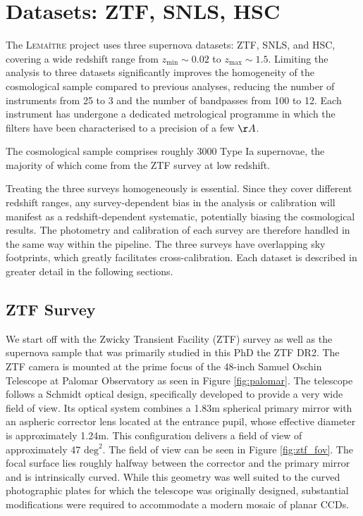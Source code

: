 \section{Datasets: ZTF, SNLS, HSC}

The \textsc{Lema\^{i}tre} project uses three supernova datasets: ZTF, 
SNLS, and HSC, covering a wide redshift range from $z_{\text{min}} \sim 0.02$ 
to $z_{\text{max}} \sim 1.5$. Limiting the analysis to three datasets 
significantly improves the homogeneity of the cosmological sample compared 
to previous analyses, reducing the number of instruments from 25 to 3 and 
the number of bandpasses from 100 to 12. Each instrument has undergone a 
dedicated metrological programme in which the filters have been characterised 
to a precision of a few $\AA$.

The cosmological sample comprises roughly 3000 Type Ia supernovae, the 
majority of which come from the ZTF survey at low redshift.

Treating the three surveys homogeneously is essential. Since they cover 
different redshift ranges, any survey-dependent bias in the analysis or 
calibration will manifest as a redshift-dependent systematic, potentially 
biasing the cosmological results. The photometry and calibration of each 
survey are therefore handled in the same way within the pipeline. The three 
surveys have overlapping sky footprints, which greatly facilitates 
cross-calibration. Each dataset is described in greater detail in the 
following sections.

\subsection{ZTF Survey} \label{sec:ztf}
We start off with the Zwicky Transient Facility (ZTF) survey as well as the supernova sample that was primarily studied in this PhD the ZTF DR2. 
The ZTF camera is mounted at the prime focus of the 48-inch Samuel 
Oschin Telescope at Palomar Observatory as seen in Figure \ref{fig:palomar}. The telescope follows a 
Schmidt optical design, specifically developed to provide a very wide 
field of view. Its optical system combines a 1.83m spherical primary 
mirror with an aspheric corrector lens located at the entrance pupil, 
whose effective diameter is approximately 1.24m. This configuration 
delivers a field of view of approximately 47 $\text{deg}^2$. The field of view can be seen in 
Figure \ref{fig:ztf_fov}. The focal surface 
lies roughly halfway between the corrector and the primary mirror and 
is intrinsically curved. While this geometry was well suited to the 
curved photographic plates for which the telescope was originally 
designed, substantial modifications were required to accommodate a 
modern mosaic of planar CCDs. \\

